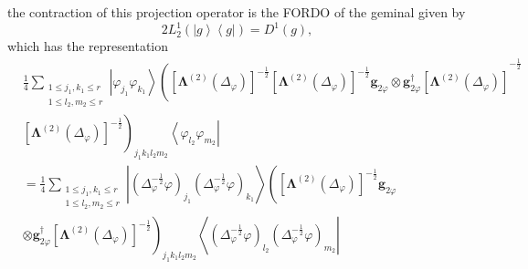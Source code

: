 \documentclass[aps,preprint]{revtex4}%
\begin{document}
the contraction of this projection operator is the FORDO of the geminal given
by
\begin{equation}
2L_{2}^{1}\left(  \left\vert g\right\rangle \left\langle g\right\vert \right)
=D^{1}\left(  g\right)  ,
\end{equation}
which has the representation%
\begin{align}
&  \frac{1}{4}\sum_{\substack{1\leq j_{1},k_{1}\leq r\\1\leq l_{2},m_{2}\leq
r}}\left\vert \varphi_{j_{1}}\varphi_{k_{1}}\right\rangle \left(  \left[
\mathbf{\Lambda}^{\left(  2\right)  }\left(  \Delta_{\varphi}\right)  \right]
^{-\frac{1}{2}}\left[  \mathbf{\Lambda}^{\left(  2\right)  }\left(
\Delta_{\varphi}\right)  \right]  ^{-\frac{1}{2}}\mathbf{g}_{2\varphi}%
\otimes\mathbf{g}_{2\varphi}^{\dagger}\left[  \mathbf{\Lambda}^{\left(
2\right)  }\left(  \Delta_{\varphi}\right)  \right]  \right.  ^{-\frac{1}{2}%
}\\
&  \left.  \left[  \mathbf{\Lambda}^{\left(  2\right)  }\left(  \Delta
_{\varphi}\right)  \right]  ^{-\frac{1}{2}}\right)  _{j_{1}k_{1}l_{2}m_{2}%
}\left\langle \varphi_{l_{2}}\varphi_{m_{2}}\right\vert \\
&  =\frac{1}{4}\sum_{\substack{1\leq j_{1},k_{1}\leq r\\1\leq l_{2},m_{2}\leq
r}}\left\vert \left(  \Delta_{\varphi}^{-\frac{1}{2}}\varphi\right)  _{j_{1}%
}\left(  \Delta_{\varphi}^{-\frac{1}{2}}\varphi\right)  _{k_{1}}\right\rangle
\left(  \left[  \mathbf{\Lambda}^{\left(  2\right)  }\left(  \Delta_{\varphi
}\right)  \right]  ^{-\frac{1}{2}}\mathbf{g}_{2\varphi}\right. \\
&  \left.  \otimes\mathbf{g}_{2\varphi}^{\dagger}\left[  \mathbf{\Lambda
}^{\left(  2\right)  }\left(  \Delta_{\varphi}\right)  \right]  ^{-\frac{1}%
{2}}\right)  _{j_{1}k_{1}l_{2}m_{2}}\left\langle \left(  \Delta_{\varphi
}^{-\frac{1}{2}}\varphi\right)  _{l_{2}}\left(  \Delta_{\varphi}^{-\frac{1}%
{2}}\varphi\right)  _{m_{2}}\right\vert
\end{align}
\end{document}
